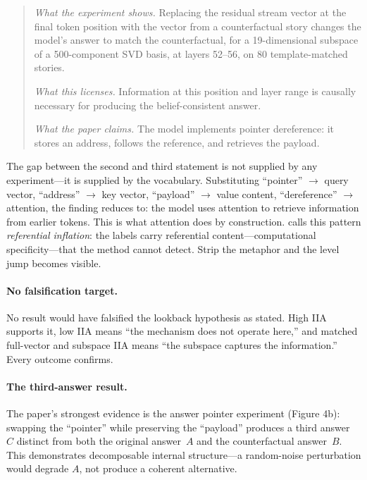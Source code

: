 \documentclass{article}
\begin{document}
\begin{quote}
\emph{What the experiment shows.} Replacing the residual stream vector at the final token position with the vector from a counterfactual story changes the model's answer to match the counterfactual, for a 19-dimensional subspace of a 500-component SVD basis, at layers 52--56, on 80 template-matched stories.

\emph{What this licenses.} Information at this position and layer range is causally necessary for producing the belief-consistent answer.

\emph{What the paper claims.} The model implements pointer dereference: it stores an address, follows the reference, and retrieves the payload.
\end{quote}

The gap between the second and third statement is not supplied by any experiment---it is supplied by the vocabulary. Substituting ``pointer'' $\rightarrow$ query vector, ``address'' $\rightarrow$ key vector, ``payload'' $\rightarrow$ value content, ``dereference'' $\rightarrow$ attention, the finding reduces to: the model uses attention to retrieve information from earlier tokens. This is what attention does by construction. \citet{tower2026mechref} calls this pattern \emph{referential inflation}: the labels carry referential content---computational specificity---that the method cannot detect. Strip the metaphor and the level jump becomes visible.

\paragraph{No falsification target.}
No result would have falsified the lookback hypothesis as stated. High IIA supports it, low IIA means ``the mechanism does not operate here,'' and matched full-vector and subspace IIA means ``the subspace captures the information.'' Every outcome confirms.

\paragraph{The third-answer result.}
The paper's strongest evidence is the answer pointer experiment (Figure 4b): swapping the ``pointer'' while preserving the ``payload'' produces a third answer~$C$ distinct from both the original answer~$A$ and the counterfactual answer~$B$. This demonstrates decomposable internal structure---a random-noise perturbation would degrade $A$, not produce a coherent alternative.
\end{document}
